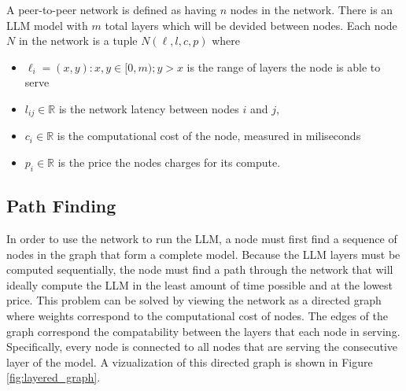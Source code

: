 \documentclass[preprint,twoside,11pt]{article}
\begin{document}
A peer-to-peer network is defined as having $n$ nodes in the network. There is an LLM model with $m$ total layers which will be devided between nodes.
Each node $N$ in the network is a tuple $N(\ell, l, c, p)$ where
\begin{itemize}
	\item $\ell _i = (x,y) : x,y \in [0,m); y > x$ is the range of layers the node is able to serve
	\item $l_{ij} \in \mathbb{R}$ is the network latency between nodes $i$ and $j$,
	\item $c_i \in \mathbb{R}$ is the computational cost of the node, measured in miliseconds
	\item $p_i \in \mathbb{R}$ is the price the nodes charges for its compute.
\end{itemize}

\subsection{Path Finding}

In order to use the network to run the LLM, a node must first find a sequence of nodes in the graph that form a complete model.
Because the LLM layers must be computed sequentially, the node must find a path through the network that will ideally compute
the LLM in the least amount of time possible and at the lowest price. This problem can be solved by viewing the network as a directed graph where weights correspond
to the computational cost of nodes. The edges of the graph correspond the compatability between the layers that each node in serving.
Specifically, every node is connected to all nodes that are serving the consecutive layer of the model. A vizualization of this directed graph is shown in Figure \ref{fig:layered_graph}.
\end{document}
